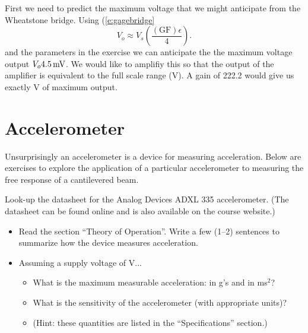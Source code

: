 \ifsolutions
\begin{soln}
First we need to predict the maximum voltage that we might anticipate from the Wheatstone bridge.  Using (\ref{e:gagebridge}
\[
V_o \approx V_s\left( \frac{(\mathrm{GF})\epsilon}{4} \right).
\]
and the parameters in the exercise we can anticipate the the maximum voltage output $V_o \unit[4.5]{mV}$.  We would like to amplifiy this so that the output of the amplifier is equivalent to the full scale range (\unit[1]{V}).  A gain of 222.2 would give us exactly \unit[1]{V} of maximum output.
\end{soln}
\fi

\section{Accelerometer}
Unsurprisingly an accelerometer is a device for measuring acceleration.  Below are exercises to explore the application of a particular accelerometer to measuring the free response of a cantilevered beam.

\begin{ex}
Look-up the datasheet for the Analog Devices ADXL 335 accelerometer.  (The datasheet can be found online and is also available on the course website.)
\begin{itemize}
\item Read the section ``Theory of Operation''.  Write a few (1--2) sentences to summarize how the device measures acceleration.
\item Assuming a supply voltage of \unit[3]{V}...
  \begin{itemize}
  \item What is the maximum measurable acceleration: in g's and in \unit[]{m}{s$^2$}?
  \item What is the sensitivity of the accelerometer (with appropriate units)?
  \item (Hint: these quantities are listed in the ``Specifications'' section.)
  \end{itemize}
\end{itemize}
\end{ex}

\ifsolutions
\begin{soln}

\end{soln}
\fi



